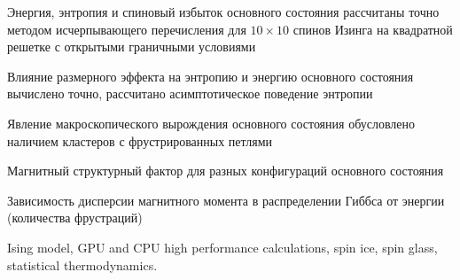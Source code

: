 \documentclass[utf8, babel, sor, jor, amsmath, amssymb, reprint]{elsarticle} %
\begin{document}
\begin{frontmatter}
\begin{abstract}
\end{abstract}


\begin{highlights}
	\item Энергия, энтропия и спиновый избыток основного состояния рассчитаны точно методом исчерпывающего перечисления для $10 \times 10$ спинов Изинга на квадратной решетке с открытыми граничными условиями
	\item Влияние размерного эффекта на энтропию и энергию основного состояния вычислено точно, рассчитано асимптотическое поведение энтропии
	\item Явление макроскопического вырождения основного состояния обусловлено наличием кластеров с фрустрированных петлями
	\item Магнитный структурный фактор для разных конфигураций основного состояния
	\item Зависимость дисперсии магнитного момента в распределении Гиббса от энергии (количества фрустраций)
\end{highlights}


\begin{keyword}
	Ising model, GPU and CPU high performance calculations, spin ice, spin glass, statistical thermodynamics.
\end{keyword}


\end{frontmatter}
\end{document}
